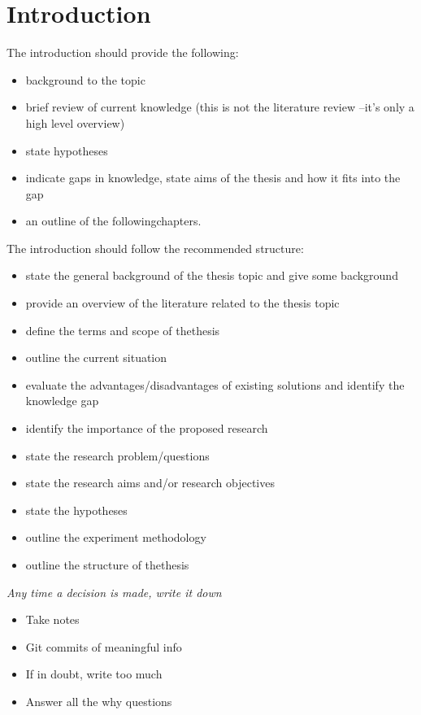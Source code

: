 
\chapter{Introduction}\label{chapter:firstchapter} %

\label{Chapter1} %

The introduction should provide the following:
\begin{itemize}
    \item background to the topic
    \item brief review of current knowledge (this is not the literature review –it’s only a high level overview)
    \item state hypotheses
    \item indicate gaps in knowledge, state aims of the thesis and how it fits into the gap
    \item an outline of the followingchapters.
\end{itemize}


The introduction should follow the recommended structure:
\begin{itemize}
    \item state the general background of the thesis topic and give some background
    \item provide an overview of the literature related to the thesis topic
    \item define the terms and scope of thethesis
    \item outline the current situation
    \item evaluate the advantages/disadvantages of existing solutions and identify the knowledge gap
    \item identify the importance of the proposed research
    \item state the research problem/questions
    \item state the research aims and/or research objectives
    \item state the hypotheses
    \item outline the experiment methodology
    \item outline the structure of thethesis
\end{itemize}


\emph{Any time a decision is made, write it down}
\begin{itemize}
    \item Take notes
    \item Git commits of meaningful info
    \item If in doubt, write too much
    \item Answer all the why questions
\end{itemize}

